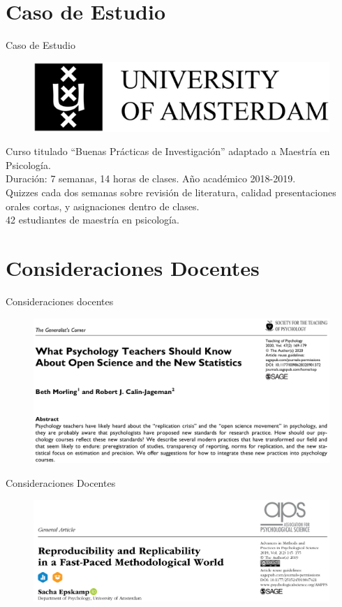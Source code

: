 \documentclass{beamer}
\begin{document}
\section{Caso de Estudio}
\begin{frame}{Caso de Estudio}
\begin{figure}
\includegraphics[width=.8\textwidth]{uA.png}
\end{figure}
Curso titulado ``Buenas Prácticas de Investigación'' adaptado a Maestría en Psicología.\\
Duración: 7 semanas, 14 horas de clases. Año académico 2018-2019.\\
Quizzes cada dos semanas sobre revisión de literatura, calidad presentaciones orales cortas, y asignaciones dentro de clases.\\
42 estudiantes de maestría en psicología.
\end{frame}

\section{Consideraciones Docentes}
\begin{frame}{Consideraciones docentes}
\begin{figure}
\includegraphics[width=1\textwidth]{Morling.png}
\end{figure}
\cite{Morling2020}
\end{frame}

\begin{frame}{Consideraciones Docentes}
\begin{figure}
\includegraphics[width=1\textwidth]{Epskamp.png}
\end{figure}
\cite{Epskamp2019}
\end{frame}
\end{document}
